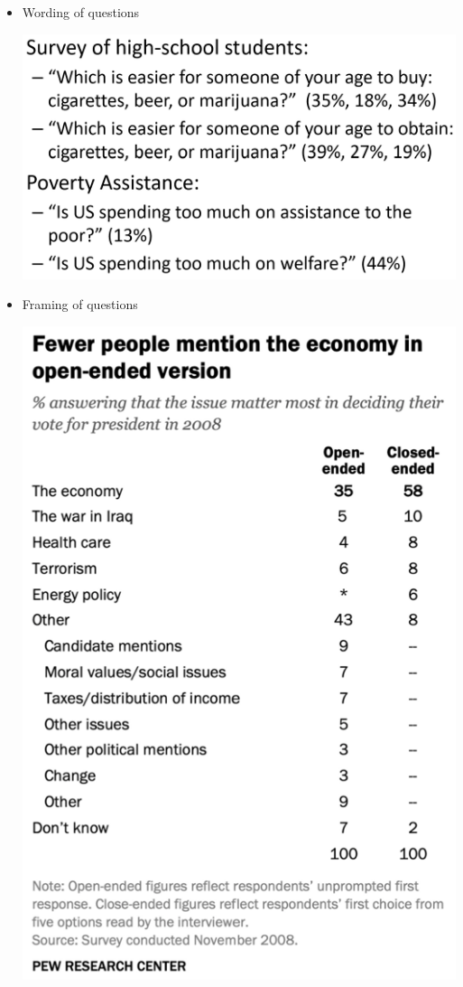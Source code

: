\documentclass[11pt,letterpaper,twoside]{article}
\begin{document}
\begin{itemize}

\item Wording of questions

\begin{center}
\includegraphics[scale=0.6]{images/wording.png}
\end{center}

\item Framing of questions

\begin{center}
\includegraphics[scale=1.2]{images/framing.png}
\end{center}

\end{itemize}

\label{totalpag}
\end{document}
